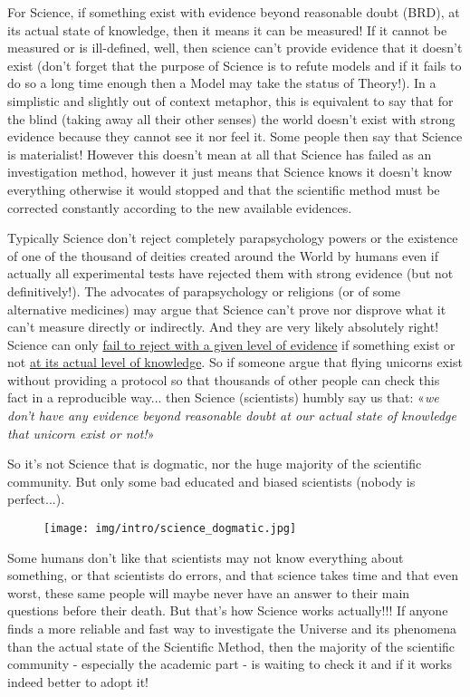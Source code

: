 	For Science, if something exist with evidence beyond reasonable doubt (BRD), at its actual state of knowledge, then it means it can be measured! If it cannot be measured or is ill-defined, well, then science can't provide evidence that it doesn't exist (don't forget that the purpose of Science is to refute models and if it fails to do so a long time enough then a Model may take the status of Theory!). In a simplistic and slightly out of context metaphor, this is equivalent to say that for the blind (taking away all their other senses) the world doesn't exist with strong evidence because they cannot see it nor feel it. Some people then say that Science is materialist! However this doesn't mean at all that Science has failed as an investigation method, however it just means that Science knows it doesn't know everything otherwise it would stopped and that the scientific method must be corrected constantly according to the new available evidences.
	
	Typically Science don't reject completely parapsychology powers or the existence of one of the thousand of deities created around the World by humans even if actually all experimental tests have rejected them with strong evidence (but not definitively!). The advocates of parapsychology or religions (or of some alternative medicines) may argue that Science can't prove nor disprove what it can't measure directly or indirectly. And they are very likely absolutely right! Science can only \underline{fail to reject with a given level of evidence} if something exist or not \underline{at its actual level of knowledge}. So if someone argue that flying unicorns exist without providing a protocol so that thousands of other people can check this fact in a reproducible way... then Science (scientists) humbly say us that: «\textit{we don't have any evidence beyond reasonable doubt at our actual state of knowledge that unicorn exist or not!}»
	
	So it's not Science that is dogmatic, nor the huge majority of the scientific community. But only some bad educated and biased scientists (nobody is perfect...).
	
	\begin{figure}[H]
		\centering
		\texttt{[image: img/intro/science\_dogmatic.jpg]}
	\end{figure}
	
	Some humans don't like that scientists may not know everything about something, or that scientists do errors, and that science takes time and that even worst, these same people will maybe never have an answer to their main questions before their death. But that's how Science works actually!!! If anyone finds a more reliable and fast way to investigate the Universe and its phenomena than the actual state of the Scientific Method, then the majority of the scientific community - especially the academic part - is waiting to check it and if it works indeed better to adopt it!
	
